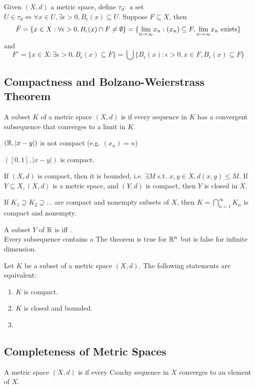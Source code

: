 \documentclass[11pt]{article}
\begin{document}
\example
Given $(X, d)$ a metric space, define $\tau_d: $ a set $U \in \tau_d \iff \forall x \in U, \exists \epsilon > 0, B_\epsilon(x) \subseteq U$. Suppose $F \subseteq X$, then
$$\bar{F} = \{x \in X: \forall \epsilon > 0, B_\epsilon(x) \cap F \neq \emptyset\} = \{\underset{n \rightarrow \infty}{\lim} x_n: (x_n) \subseteq F, \underset{n \rightarrow \infty}{\lim} x_n \text{ exists}\}$$
and
$$F^\circ = \{x \in X: \exists\epsilon >0, B_\epsilon(x)\subseteq F\} = \bigcup \{B_\epsilon(x): \epsilon >0, x \in F, B_\epsilon(x) \subseteq F\}$$

\subsection{Compactness and Bolzano-Weierstrass Theorem}
A subset $K$ of a metric space $(X, d)$ is  if every sequence in $K$ has a convergent subsequence that converges to a limit in $K$.

\example
$(\mathbb{R}, |x - y|)$ is not compact (e.g. $(x_n) = n$)

\example
$([0,1], |x-y|)$ is compact.

\property If $(X, d)$ is compact, then it is bounded, i.e. $\exists M$ s.t. $x, y \in X, d(x,y) \leq M$.
\property If $Y \subseteq X, (X, d)$ is a metric space, and $(Y, d)$ is compact, then $Y$ is closed in $X$.

\property If $K_1 \supseteq K_2 \supseteq \hdots$ are compact and nonempty subsets of $X$, then $K = \bigcap_{n=1}^\infty K_n$ is compact and nonempty.

 A subset $Y$ of $\mathbb{R}$ is  iff . \\
 Every  subsequence contains a 
\remark The theorem is true for $\mathbb{R}^n$ but is false for infinite dimension.

Let $K$ be a subset of a metric space $(X, d)$. The following statements are equivalent:
\begin{enumerate}
	\item $K$ is compact.
	\item $K$ is closed and bounded.
	\item {}

\end{enumerate}

\subsection{Completeness of Metric Spaces}
A metric space $(X, d)$ is  if every Cauchy sequence in $X$ converges to an element of $X$.
\end{document}
